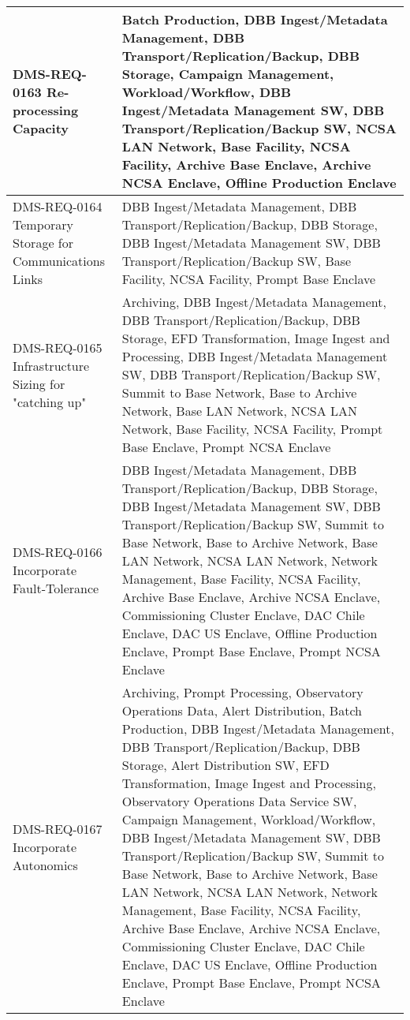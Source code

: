 \begin{xtabular}{p{0.4\textwidth}p{0.55\textwidth}}
DMS-REQ-0163 Re-processing Capacity & Batch Production, DBB Ingest/Metadata Management, DBB Transport/Replication/Backup, DBB Storage, Campaign Management, Workload/Workflow, DBB Ingest/Metadata Management SW, DBB Transport/Replication/Backup SW, NCSA LAN Network, Base Facility, NCSA Facility, Archive Base Enclave, Archive NCSA Enclave, Offline Production Enclave \\ \hline
DMS-REQ-0164 Temporary Storage for Communications Links & DBB Ingest/Metadata Management, DBB Transport/Replication/Backup, DBB Storage, DBB Ingest/Metadata Management SW, DBB Transport/Replication/Backup SW, Base Facility, NCSA Facility, Prompt Base Enclave \\ \hline
DMS-REQ-0165 Infrastructure Sizing for "catching up" & Archiving, DBB Ingest/Metadata Management, DBB Transport/Replication/Backup, DBB Storage, EFD Transformation, Image Ingest and Processing, DBB Ingest/Metadata Management SW, DBB Transport/Replication/Backup SW, Summit to Base Network, Base to Archive Network, Base LAN Network, NCSA LAN Network, Base Facility, NCSA Facility, Prompt Base Enclave, Prompt NCSA Enclave \\ \hline
DMS-REQ-0166 Incorporate Fault-Tolerance & DBB Ingest/Metadata Management, DBB Transport/Replication/Backup, DBB Storage, DBB Ingest/Metadata Management SW, DBB Transport/Replication/Backup SW, Summit to Base Network, Base to Archive Network, Base LAN Network, NCSA LAN Network, Network Management, Base Facility, NCSA Facility, Archive Base Enclave, Archive NCSA Enclave, Commissioning Cluster Enclave, DAC Chile Enclave, DAC US Enclave, Offline Production Enclave, Prompt Base Enclave, Prompt NCSA Enclave \\ \hline
DMS-REQ-0167 Incorporate Autonomics & Archiving, Prompt Processing, Observatory Operations Data, Alert Distribution, Batch Production, DBB Ingest/Metadata Management, DBB Transport/Replication/Backup, DBB Storage, Alert Distribution SW, EFD Transformation, Image Ingest and Processing, Observatory Operations Data Service SW, Campaign Management, Workload/Workflow, DBB Ingest/Metadata Management SW, DBB Transport/Replication/Backup SW, Summit to Base Network, Base to Archive Network, Base LAN Network, NCSA LAN Network, Network Management, Base Facility, NCSA Facility, Archive Base Enclave, Archive NCSA Enclave, Commissioning Cluster Enclave, DAC Chile Enclave, DAC US Enclave, Offline Production Enclave, Prompt Base Enclave, Prompt NCSA Enclave \\ \hline

\end{xtabular}
